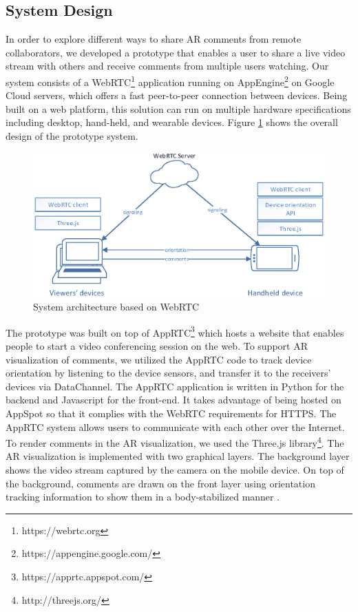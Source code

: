 \subsection{System Design}

In order to explore different ways to share AR comments from remote collaborators, we developed a prototype that enables a user to share a live video stream with others and receive comments from multiple users watching. Our system consists of a WebRTC\footnote{https://webrtc.org} application running on AppEngine\footnote{https://appengine.google.com/} on Google Cloud servers, which offers a fast peer-to-peer connection between devices. Being built on a web platform, this solution can run on multiple hardware specifications including desktop, hand-held, and wearable devices. Figure \ref{fig:mgia16:system} shows the overall design of the prototype system.

\begin{figure}[ht]
  \centering
  \includegraphics[width=\linewidth]{images/mgia16/system}
  \caption{System architecture based on WebRTC}
	\label{fig:mgia16:system}
\end{figure}

The prototype was built on top of AppRTC\footnote{https://apprtc.appspot.com/} which hosts a website that enables people to start a video conferencing session on the web. To support AR visualization of comments, we utilized the AppRTC code to track device orientation by listening to the device sensors, and transfer it to the receivers’ devices via DataChannel. The AppRTC application is written in Python for the backend and Javascript for the front-end. It takes advantage of being hosted on AppSpot so that it complies with the WebRTC requirements for HTTPS. The AppRTC system allows users to communicate with each other over the Internet. To render comments in the AR visualization, we used the Three.js library\footnote{http://threejs.org/}. The AR visualization is implemented with two graphical layers. The background layer shows the video stream captured by the camera on the mobile device. On top of the background, comments are drawn on the front layer using orientation tracking information to show them in a body-stabilized manner \cite{Billinghurst1998}. 

